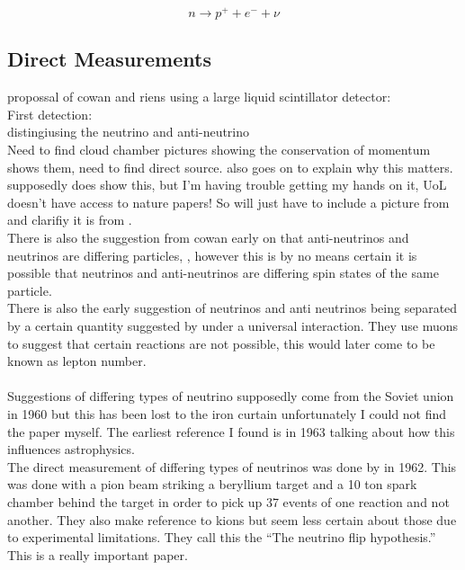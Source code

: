 \documentclass[12pt,a4paper]{article}
\begin{document}
\begin{equation}
    n \rightarrow p^+ + e^- + \nu
    \label{semi_modern_beta_decay}
\end{equation}

\subsection{Direct Measurements}
propossal of cowan and riens using a large liquid scintillator detector: \cite{reines1953proposed}
\\First detection: \cite{reines1953detection}
\\distingiusing the neutrino and anti-neutrino \cite{davis1959attempt}
\\Need to find cloud chamber pictures showing the conservation of momentum \cite{griffiths2008introduction} shows them, need to find direct source. \cite{griffiths2008introduction} also goes on to explain why this matters.
\\ \cite{michel1949energy} supposedly does show this, but I'm having trouble getting my hands on it, UoL doesn't have access to nature papers! So will just have to include a picture from \cite{griffiths2008introduction} and clarifiy it is from \cite{michel1949energy}.
\\ There is also the suggestion from cowan early on that anti-neutrinos and neutrinos are differing particles,  \cite{cowan1957test}, however this is by no means certain it is possible that neutrinos and anti-neutrinos are differing spin states of the same particle.
\\ There is also the early suggestion of neutrinos and anti neutrinos being separated by a certain quantity suggested by \cite{konopinski1953universal} under a universal interaction. They use muons to suggest that certain reactions are not possible, this would later come to be known as lepton number. \\\\
Suggestions of differing types of neutrino supposedly come from the Soviet union in 1960 but this has been lost to the iron curtain unfortunately I could not find the paper myself. The earliest reference I found is \cite{pontecorvo1963neutrino} in 1963 talking about how this influences astrophysics. 
\\The direct measurement of differing types of neutrinos was done by \cite{DanbyG1962PhysRevLett.9.36} in 1962. This was done with a pion beam striking a beryllium target and a 10 ton spark chamber behind the target in order to pick up 37 events of one reaction and not another. They also make reference to kions but seem less certain about those due to experimental limitations. They call this the ``The neutrino flip hypothesis.'' This is a really important paper.\\
\end{document}
